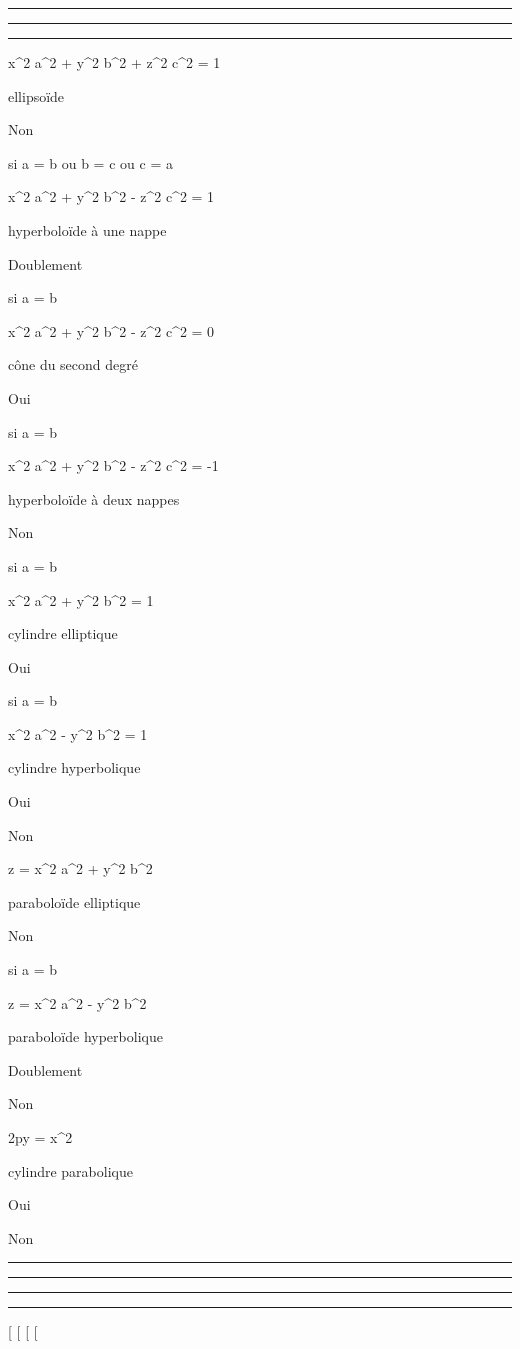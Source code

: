 \documentclass[]{article}
\begin{document}
\begin{center}\rule{3in}{0.4pt}\end{center}

\begin{center}\rule{3in}{0.4pt}\end{center}

\begin{center}\rule{3in}{0.4pt}\end{center}

 x^2 \over a^2 +
y^2 \over b^2 + z^2
\over c^2 = 1

ellipsoïde

Non

si a = b ou b = c ou c = a

 x^2 \over a^2 +
y^2 \over b^2 - z^2
\over c^2 = 1

hyperboloïde à une nappe

Doublement

si a = b

 x^2 \over a^2 +
y^2 \over b^2 - z^2
\over c^2 = 0

cône du second degré

Oui

si a = b

 x^2 \over a^2 +
y^2 \over b^2 - z^2
\over c^2 = -1

hyperboloïde à deux nappes

Non

si a = b

 x^2 \over a^2 +
y^2 \over b^2 = 1

cylindre elliptique

Oui

si a = b

 x^2 \over a^2 -
y^2 \over b^2 = 1

cylindre hyperbolique

Oui

Non

z = x^2 \over a^2 +
y^2 \over b^2

paraboloïde elliptique

Non

si a = b

z = x^2 \over a^2 -
y^2 \over b^2

paraboloïde hyperbolique

Doublement

Non

2py = x^2

cylindre parabolique

Oui

Non

\begin{center}\rule{3in}{0.4pt}\end{center}

\begin{center}\rule{3in}{0.4pt}\end{center}

\begin{center}\rule{3in}{0.4pt}\end{center}

\begin{center}\rule{3in}{0.4pt}\end{center}

{[}
{[}
{[}
{[}
\end{document}
